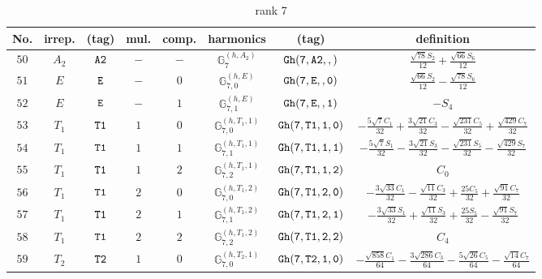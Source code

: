 \documentclass[fleqn,8pt]{jsarticle}
\begin{document}
\begin{table}[ht!]
\begin{center}
\caption{rank 7}
\renewcommand{\arraystretch}{1.3}
\begin{tabular}{cccccccc} \hline \hline
No. & irrep. & (tag) & mul. & comp. & harmonics & (tag) & definition \\ \hline
$ 50 $ & $ A_{2} $ & $ {\tt A2} $ & $ - $ & $ - $ & $ \mathbb{G}_{7}^{(h,A_{2})} $ & $ {\tt Gh(7,A2,,)} $ & $ \frac{\sqrt{78} S_{2}}{12} + \frac{\sqrt{66} S_{6}}{12} $ \\
$ 51 $ & $ E $ & $ {\tt E} $ & $ - $ & $ 0 $ & $ \mathbb{G}_{7,0}^{(h,E)} $ & $ {\tt Gh(7,E,,0)} $ & $ \frac{\sqrt{66} S_{2}}{12} - \frac{\sqrt{78} S_{6}}{12} $ \\
$ 52 $ & $ E $ & $ {\tt E} $ & $ - $ & $ 1 $ & $ \mathbb{G}_{7,1}^{(h,E)} $ & $ {\tt Gh(7,E,,1)} $ & $ - S_{4} $ \\
$ 53 $ & $ T_{1} $ & $ {\tt T1} $ & $ 1 $ & $ 0 $ & $ \mathbb{G}_{7,0}^{(h,T_{1},1)} $ & $ {\tt Gh(7,T1,1,0)} $ & $ - \frac{5 \sqrt{7} C_{1}}{32} + \frac{3 \sqrt{21} C_{3}}{32} - \frac{\sqrt{231} C_{5}}{32} + \frac{\sqrt{429} C_{7}}{32} $ \\
$ 54 $ & $ T_{1} $ & $ {\tt T1} $ & $ 1 $ & $ 1 $ & $ \mathbb{G}_{7,1}^{(h,T_{1},1)} $ & $ {\tt Gh(7,T1,1,1)} $ & $ - \frac{5 \sqrt{7} S_{1}}{32} - \frac{3 \sqrt{21} S_{3}}{32} - \frac{\sqrt{231} S_{5}}{32} - \frac{\sqrt{429} S_{7}}{32} $ \\
$ 55 $ & $ T_{1} $ & $ {\tt T1} $ & $ 1 $ & $ 2 $ & $ \mathbb{G}_{7,2}^{(h,T_{1},1)} $ & $ {\tt Gh(7,T1,1,2)} $ & $ C_{0} $ \\
$ 56 $ & $ T_{1} $ & $ {\tt T1} $ & $ 2 $ & $ 0 $ & $ \mathbb{G}_{7,0}^{(h,T_{1},2)} $ & $ {\tt Gh(7,T1,2,0)} $ & $ - \frac{3 \sqrt{33} C_{1}}{32} - \frac{\sqrt{11} C_{3}}{32} + \frac{25 C_{5}}{32} + \frac{\sqrt{91} C_{7}}{32} $ \\
$ 57 $ & $ T_{1} $ & $ {\tt T1} $ & $ 2 $ & $ 1 $ & $ \mathbb{G}_{7,1}^{(h,T_{1},2)} $ & $ {\tt Gh(7,T1,2,1)} $ & $ - \frac{3 \sqrt{33} S_{1}}{32} + \frac{\sqrt{11} S_{3}}{32} + \frac{25 S_{5}}{32} - \frac{\sqrt{91} S_{7}}{32} $ \\
$ 58 $ & $ T_{1} $ & $ {\tt T1} $ & $ 2 $ & $ 2 $ & $ \mathbb{G}_{7,2}^{(h,T_{1},2)} $ & $ {\tt Gh(7,T1,2,2)} $ & $ C_{4} $ \\
$ 59 $ & $ T_{2} $ & $ {\tt T2} $ & $ 1 $ & $ 0 $ & $ \mathbb{G}_{7,0}^{(h,T_{2},1)} $ & $ {\tt Gh(7,T2,1,0)} $ & $ - \frac{\sqrt{858} C_{1}}{64} - \frac{3 \sqrt{286} C_{3}}{64} - \frac{5 \sqrt{26} C_{5}}{64} - \frac{\sqrt{14} C_{7}}{64} $ \\

\end{tabular}
\end{center}
\end{table}
\end{document}
